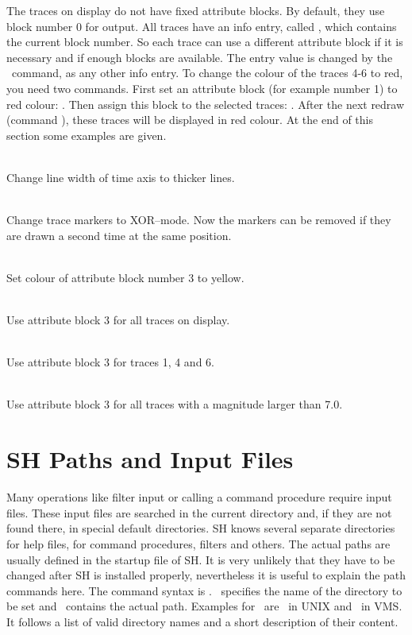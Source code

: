 The traces on display do not have fixed attribute blocks.  By
default, they use block number 0 for output.  All traces have
an info entry, called , which contains the current
block number.  So each trace can use a different attribute
block if it is necessary and if enough blocks are available.
The entry value is changed by the \ command, as any
other info entry.  To change the colour of the traces 4-6 to red,
you need two commands.  First set an attribute block (for example
number 1) to red colour: .  Then
assign this block to the selected traces: .
After the next redraw (command ), these traces will be
displayed in red colour.  At the end of this section some
examples are given.
\smallskip

\noindent
{}\\
Change line width of time axis to thicker lines.
\smallskip

\noindent
{}\\
Change trace markers to XOR--mode.  Now the markers can be removed
if they are drawn a second time at the same position.
\smallskip

\noindent
{}\\
Set colour of attribute block number 3 to yellow.
\smallskip

\noindent
{}\\
Use attribute block 3 for all traces on display.
\smallskip

\noindent
{}\\
Use attribute block 3 for traces 1, 4 and 6.
\smallskip

\noindent
{}\\
Use attribute block 3 for all traces with a magnitude larger than 7.0.



\section{SH Paths and Input Files}
\label{sec:SHLibs}

Many operations like filter input or calling a command procedure
require input files.  These input files are searched in the
current directory and, if they are not found there, in special
default directories.  SH knows several separate directories for
help files, for command procedures, filters and others.  The actual
paths are usually defined in the startup file of SH.  It is very
unlikely that they have to be changed after SH is installed
properly, nevertheless it is useful to explain the path commands
here.  The command syntax is .
\ specifies the name of the directory to be set and
\ contains the actual path.  Examples for \
are \ in UNIX and \
in VMS.  It follows a list of valid directory names and a short
description of their content.

